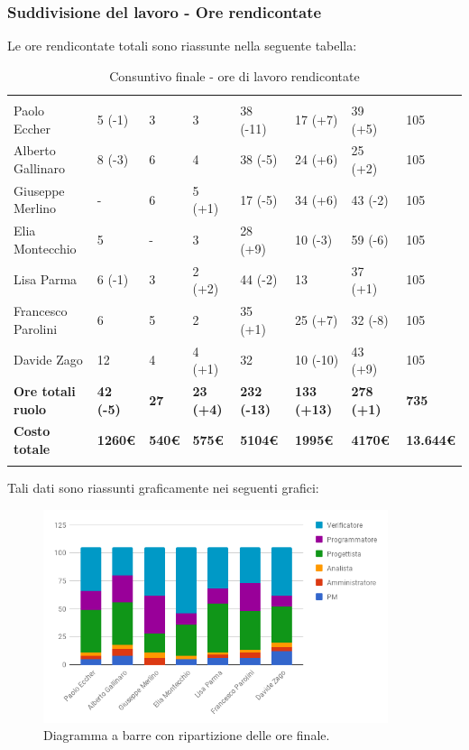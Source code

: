 \subsubsection{Suddivisione del lavoro - Ore rendicontate}
Le ore rendicontate totali sono riassunte nella seguente tabella:

\begin{table}[H]
	\centering
	\begin{tabular}{|C{3.5cm}|C{1cm}|C{1cm}|C{1cm}|C{1.1cm}|C{1.1cm}|C{1.1cm}|C{1.8cm}|}
		 & & &&&&&\\
		Paolo Eccher      & 5 (-1) & 3 & 3 & 38 (-11) & 17 (+7) & 39 (+5) & 105 \\
		\hline
		Alberto Gallinaro & 8 (-3) & 6 & 4 & 38 (-5) & 24 (+6) & 25 (+2) & 105 \\
		\hline
		Giuseppe Merlino  & - & 6 & 5 (+1) & 17 (-5) & 34 (+6) & 43 (-2) & 105 \\
		\hline
		Elia Montecchio   & 5 & - & 3 & 28 (+9) & 10 (-3) & 59 (-6) & 105 \\
		\hline
		Lisa Parma        & 6 (-1) & 3 & 2 (+2) & 44 (-2) & 13 & 37 (+1) & 105 \\
		\hline
		Francesco Parolini& 6 & 5 & 2 & 35 (+1) & 25 (+7) & 32 (-8) & 105 \\
		\hline
		Davide Zago       & 12 & 4 & 4 (+1) & 32 & 10 (-10) & 43 (+9) & 105 \\
		\hline
		\textbf{Ore totali ruolo}  & \textbf{42 (-5)} & \textbf{27} & \textbf{23 (+4)} & \textbf{232 (-13)} & \textbf{133 (+13)} & \textbf{278 (+1)} & \textbf{735} \\
		\textbf{Costo totale}  & \textbf{1260\euro} & \textbf{540\euro} & \textbf{575\euro} & \textbf{5104\euro} & \textbf{1995\euro} & \textbf{4170\euro} & \textbf{13.644\euro} \\
	\end{tabular}
	\caption{Consuntivo finale - ore di lavoro rendicontate}
\end{table}

Tali dati sono riassunti graficamente nei seguenti grafici:


\begin{figure}[H] 
	\centering 
	\includegraphics[width=0.9\textwidth]{images/BarreFinaleRendicontate.png} 
	\caption{Diagramma a barre con ripartizione delle ore finale.}
	\label{BarreFinaleRendicontate}
\end{figure}

